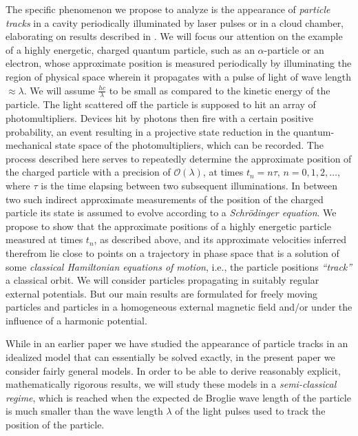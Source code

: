 \documentclass[11pt]{article}
\begin{document}
The specific phenomenon we propose to analyze is the appearance of \textit{particle tracks} in a cavity periodically illuminated by 
laser pulses or in a cloud chamber, elaborating on results described in \cite{BBFF}. 
We will focus our attention on the example of a highly energetic, charged quantum particle, such as an $\alpha$-particle 
or an electron, whose approximate position is measured periodically by illuminating the region of physical space wherein
it propagates with a pulse of light of wave length $\approx\lambda$. We will assume $\frac{hc}{\lambda}$ to be small as 
compared to the kinetic energy of the particle. The light scattered off the particle is supposed to hit an array of 
photomultipliers. Devices hit by photons then fire with a certain positive probability, an event resulting in a projective state 
reduction in the quantum-mechanical state space of the photomultipliers, which can be recorded. The process described 
here serves to repeatedly determine the approximate position of the charged particle with a precision of $\mathcal{O}(\lambda)$, 
at times $t_n= n\tau,\, n=0,1,2, \dots,$ where $\tau$ is the time elapsing between two subsequent illuminations. 
In between two such indirect approximate measurements of the position of the charged particle
its state is assumed to evolve according to a \textit{Schr\"odinger equation}. 
We propose to show that the approximate positions of a highly energetic particle measured 
at times $t_n$, as described above, and its approximate velocities inferred therefrom lie close to points on a trajectory 
in phase space that is a solution of some \textit{classical Hamiltonian equations of motion}, i.e., the particle positions 
\textit{``track''} a classical orbit. We will consider particles propagating in suitably regular external potentials. But
our main results are formulated for freely moving particles and particles in a homogeneous external 
magnetic field and/or under the influence of a harmonic potential. 

While in an earlier paper \cite{BBFF} we have studied the appearance of particle tracks in an idealized model 
that can essentially be solved exactly, in the present paper we consider fairly general models. In order to be able 
to derive reasonably explicit, mathematically rigorous results, we will study these models in a 
\textit{semi-classical regime}, which is reached when the expected de Broglie wave length of the 
particle is much smaller than the wave length $\lambda$ of the light pulses used to track the position 
of the particle. 
\end{document}

